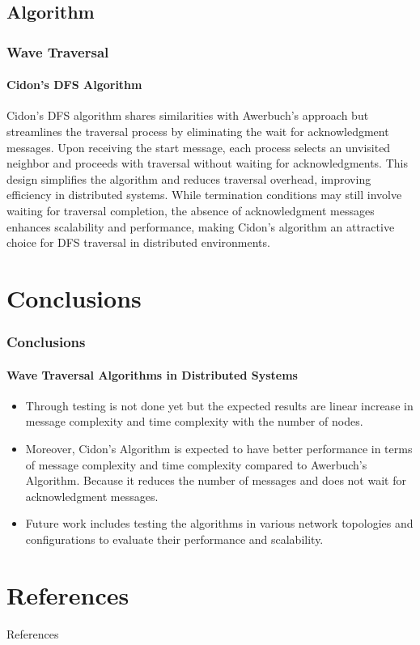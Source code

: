 \documentclass[11pt]{beamer}              %
\begin{document}
\subsection{Algorithm}

\begin{frame}
\frametitle{Wave Traversal}
\framesubtitle{Cidon's DFS Algorithm}
Cidon's DFS algorithm shares similarities with Awerbuch's approach but streamlines the traversal process by eliminating the wait for acknowledgment messages.
 Upon receiving the start message, each process selects an unvisited neighbor and proceeds with traversal without waiting for acknowledgments.
 This design simplifies the algorithm and reduces traversal overhead, improving efficiency in distributed systems.
 While termination conditions may still involve waiting for traversal completion, the absence of acknowledgment messages enhances scalability and performance, making Cidon's algorithm an attractive choice for DFS traversal in distributed environments.
\end{frame}


\section{Conclusions}
\begin{frame}
\frametitle{Conclusions}
\framesubtitle{Wave Traversal Algorithms in Distributed Systems}
\begin{itemize}
    \item Through testing is not done yet but the expected results are linear increase in message complexity and time complexity  with the number of nodes.
    \item Moreover, Cidon's Algorithm is expected to have better performance in terms of message complexity and time complexity compared to Awerbuch's Algorithm. Because it reduces the number of messages and does not wait for acknowledgment messages.
    \item Future work includes testing the algorithms in various network topologies and configurations to evaluate their performance and scalability.
\end{itemize}

\end{frame}

\section*{References}
\begin{frame}{References}


\nocite{*} %
\end{frame}


\thankslide
\end{document}
